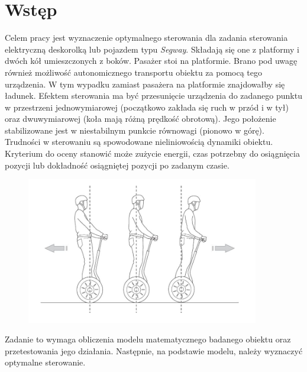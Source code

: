 \section{Wstęp}
\label{sec:wstep}

Celem pracy jest wyznaczenie optymalnego sterowania dla zadania sterowania elektryczną deskorolką lub pojazdem typu \textit{Segway}. Składają się one z platformy i dwóch kół umieszczonych z boków. Pasażer stoi na platformie. Brano pod uwagę również możliwość autonomicznego transportu obiektu za pomocą tego urządzenia. W tym wypadku zamiast pasażera na platformie znajdowałby się ładunek. Efektem sterowania ma być przesunięcie urządzenia do zadanego punktu w przestrzeni jednowymiarowej (początkowo zakłada się ruch w przód i w tył) oraz dwuwymiarowej (koła mają różną prędkość obrotową). Jego położenie stabilizowane jest w niestabilnym punkcie równowagi (pionowo w górę). Trudności w sterowaniu są spowodowane nieliniowością dynamiki obiektu. Kryterium do oceny stanowić może zużycie energii, czas potrzebny do osiągnięcia pozycji lub dokładność osiągniętej pozycji po zadanym czasie. %

\begin{figure}[h]
	\centering
	\includegraphics[width=4in]{Figures/wstep_segway.jpg}
	\label{fig:wstep_segway}
\end{figure}

Zadanie to wymaga obliczenia modelu matematycznego badanego obiektu oraz przetestowania jego działania. Następnie, na podstawie modelu, należy wyznaczyć optymalne sterowanie.